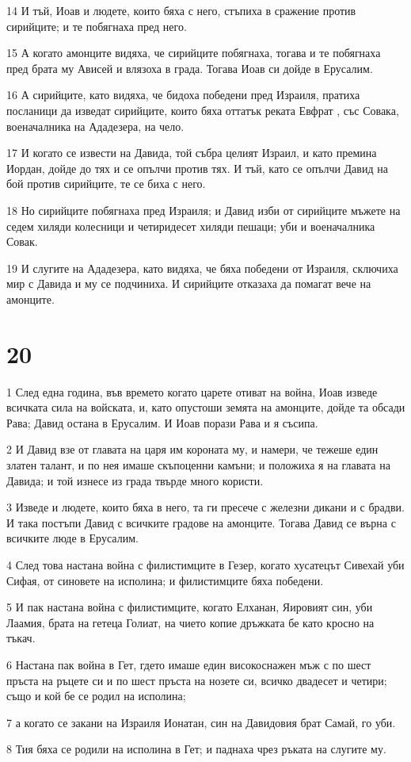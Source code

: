 \par 14 И тъй, Иоав и людете, които бяха с него, стъпиха в сражение против сирийците; и те побягнаха пред него.
\par 15 А когато амонците видяха, че сирийците побягнаха, тогава и те побягнаха пред брата му Ависей и влязоха в града. Тогава Иоав си дойде в Ерусалим.
\par 16 А сирийците, като видяха, че бидоха победени пред Израиля, пратиха посланици да изведат сирийците, които бяха оттатък реката Евфрат , със Совака, военачалника на Ададезера, на чело.
\par 17 И когато се извести на Давида, той събра целият Израил, и като премина Иордан, дойде до тях и се опълчи против тях. И тъй, като се опълчи Давид на бой против сирийците, те се биха с него.
\par 18 Но сирийците побягнаха пред Израиля; и Давид изби от сирийците мъжете на седем хиляди колесници и четиридесет хиляди пешаци; уби и военачалника Совак.
\par 19 И слугите на Ададезера, като видяха, че бяха победени от Израиля, сключиха мир с Давида и му се подчиниха. И сирийците отказаха да помагат вече на амонците.

\chapter{20}

\par 1 След една година, във времето когато царете отиват на война, Иоав изведе всичката сила на войската, и, като опустоши земята на амонците, дойде та обсади Рава; Давид остана в Ерусалим. И Иоав порази Рава и я съсипа.
\par 2 И Давид взе от главата на царя им короната му, и намери, че тежеше един златен талант, и по нея имаше скъпоценни камъни; и положиха я на главата на Давида; и той изнесе из града твърде много користи.
\par 3 Изведе и людете, които бяха в него, та ги пресече с железни дикани и с брадви. И така постъпи Давид с всичките градове на амонците. Тогава Давид се върна с всичките люде в Ерусалим.
\par 4 След това настана война с филистимците в Гезер, когато хусатецът Сивехай уби Сифая, от синовете на исполина; и филистимците бяха победени.
\par 5 И пак настана война с филистимците, когато Елханан, Яировият син, уби Лаамия, брата на гетеца Голиат, на чието копие дръжката бе като кросно на тъкач.
\par 6 Настана пак война в Гет, гдето имаше един високоснажен мъж с по шест пръста на ръцете си и по шест пръста на нозете си, всичко двадесет и четири; също и кой бе се родил на исполина;
\par 7 а когато се закани на Израиля Ионатан, син на Давидовия брат Самай, го уби.
\par 8 Тия бяха се родили на исполина в Гет; и паднаха чрез ръката на слугите му.

